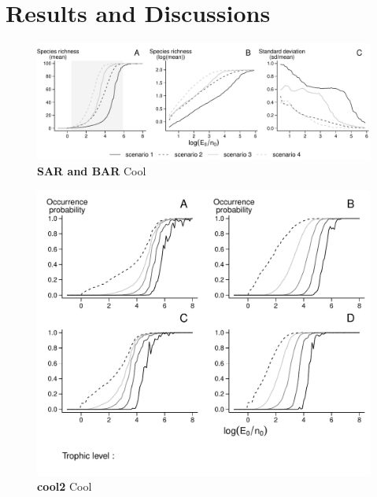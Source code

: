 \section{Results and Discussions}\label{results-and-discussions}

\begin{figure}[htbp]
\centering
\includegraphics{chapitre4/fig/fig1.pdf}
\caption{\textbf{SAR and BAR} Cool}
\end{figure}

\begin{figure}[htbp]
\centering
\includegraphics{chapitre4/fig/fig2.pdf}
\caption{\textbf{cool2} Cool}
\end{figure}

